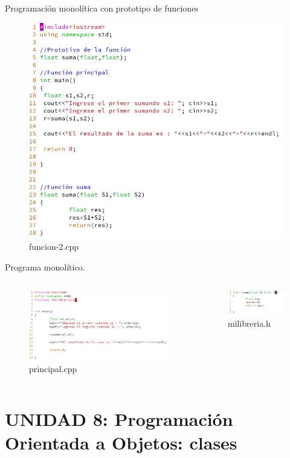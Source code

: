 \documentclass[presentation, aspectratio=54]{beamer}
\begin{document}
\begin{frame}[label={sec:org78d3642}]{Programación monolítica con prototipo de funciones}
\begin{figure}[htbp]
\centering
\includegraphics[width=0.8\linewidth]{./images/codigo/funcion2.png}
funcion-2.cpp
\end{figure}
\end{frame}

\begin{frame}[label={sec:org3d0ef5d}]{Programa monolítico.}
\begin{columns}
\begin{column}{0.45\columnwidth}
\begin{figure}[htbp]
\centering
\includegraphics[width=1.3\textwidth]{./images/codigo/principal.png}
principal.cpp
\end{figure}
\end{column}
\begin{column}{0.45\columnwidth}
\begin{figure}[htbp]
\centering
\includegraphics[width=0.7\linewidth]{./images/codigo/milibreria.png}
milibreria.h
\end{figure}
\end{column}
\end{columns}
\end{frame}



\section{UNIDAD 8: Programación Orientada a Objetos: clases}
\label{sec:orgc84f40b}
\end{document}

